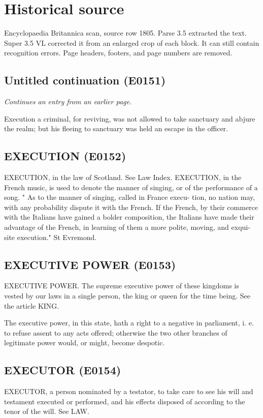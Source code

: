 \documentclass{article}
\begin{document}
\section*{Historical source}
Encyclopaedia Britannica scan, source row 1805. Parse 3.5 extracted the text. Super 3.5 VL corrected it from an enlarged crop of each block. It can still contain recognition errors.
Page headers, footers, and page numbers are removed.

\subsection*{Untitled continuation (E0151)}
\textit{Continues an entry from an earlier page.}

Execution a criminal, for reviving, was not allowed to take sanctuary and abjure the realm; but his fleeing to sanctuary was held an escape in the officer.

\subsection*{EXECUTION (E0152)}
EXECUTION, in the law of Scotland. See Law Index.
EXECUTION, in the French music, is used to denote
the manner of singing, or of the performance of a song.
" As to the manner of singing, called in France execu-
tion, no nation may, with any probability dispute it
with the French. If the French, by their commerce
with the Italians have gained a bolder composition,
the Italians have made their advantage of the French,
in learning of them a more polite, moving, and exqui-
site execution." St Evremond.

\subsection*{EXECUTIVE POWER (E0153)}
EXECUTIVE POWER. The supreme executive power of these kingdoms is vested by our laws in a single person, the king or queen for the time being. See the article KING.

The executive power, in this state, hath a right to a negative in parliament, i. e. to refuse assent to any acts offered; otherwise the two other branches of legitimate power would, or might, become despotic.

\subsection*{EXECUTOR (E0154)}
EXECUTOR, a person nominated by a testator, to take care to see his will and testament executed or performed, and his effects disposed of according to the tenor of the will. See LAW.
\end{document}
